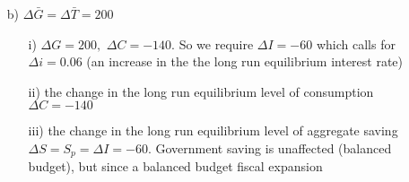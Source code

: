 \documentclass[12pt,a4paper]{article}
\begin{document}
\begin{enumerate}
\begin{enumerate}
  \item [b)]$\Delta\bar{G}=\Delta\bar{T}=200$

    \begin{enumerate}
    \item [i)]$\Delta G=200,$ $\Delta C=-140.$ So we require $\Delta
      I=-60$ which calls for $\Delta i=0.06$ (an increase in the the
      long run equilibrium interest rate)

    \item[ii)] the change in the long run equilibrium level of
      consumption $\Delta C=-140$

    \item[iii)] the change in the long run equilibrium level of
      aggregate saving $\Delta S=S_{p}=\Delta I=-60.$ Government
      saving is unaffected (balanced budget), but since a balanced
      budget fiscal expansion
    \end{enumerate}
  \end{enumerate}
\end{enumerate}






\end{document}
